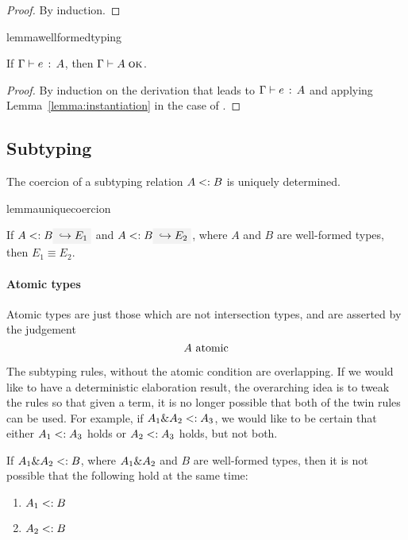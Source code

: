 \begin{proof}
  By induction.
\end{proof}

\begin{restatable}{lemma}{wellformedtyping}
  \label{lemma:wellformed-typing}

  If $\Gamma \vdash e \ \!:\! \ A$, then $\Gamma \vdash A \; \textsc{ok}$.
\end{restatable}

\begin{proof}
  By induction on the derivation that leads to $\Gamma \vdash e \ \!:\! \ A$ and applying
  Lemma~\ref{lemma:instantiation} in the case of .
\end{proof}

\subsection{Subtyping}

The coercion of a subtyping relation $A <: B$ is uniquely determined.
\begin{restatable}{lemma}{uniquecoercion}
  \label{lemma:unique-coercion}

  If $A \subtype B \yields {E_1}$ and $A \subtype B \yields {E_2}$, where $A$
  and $B$ are well-formed types, then $E_1 \equiv E_2$.
\end{restatable}


\paragraph{Atomic types} Atomic types are just those which are not intersection
types, and are asserted by the judgement \[ A \ \textnormal{atomic} \]

The subtyping rules, without the atomic condition are overlapping. If we would
like to have a deterministic elaboration result, the overarching idea is to
tweak the rules so that given a term, it is no longer possible that both of the
twin rules can be used. For example, if $A_1 \& A_2 <: A_3$, we would
like to be certain that either $A_1 <: A_3$ holds or $A_2 <: A_3$
holds, but not both.

\begin{lemma}
  \label{lemma:unique-subtype-contributor}

  If $A_1 \& A_2 <: B$, where $A_1 \& A_2$ and $B$ are well-formed types,
  then it is not possible that the following hold at the same time:
  \begin{enumerate}
    \item $A_1 <: B$
    \item $A_2 <: B$
  \end{enumerate}
\end{lemma}


